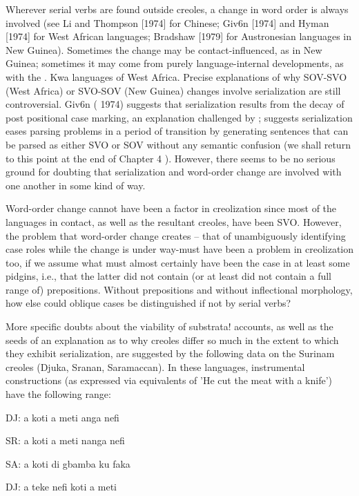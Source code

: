 Wherever serial verbs are found outside creoles, a change in word order is always involved (see Li and Thompson [1974] for Chinese; Giv6n [1974] and Hyman [1974] for West African languages; Brad\-shaw [1979] for Austronesian languages in New Guinea). Sometimes the change may be contact-influenced, as in New Guinea; sometimes it may come from purely language-internal developments, as with the . Kwa languages of West Africa. Precise explanations of why SOV-SVO (West Africa) or SVO-SOV (New Guinea) changes involve serialization are still controversial. Giv6n ( 1974) suggests that serialization results from the decay of post positional case marking, an explanation chal\-lenged by \citet{Hyman1974}; \citet{Bradshaw1979} suggests serialization eases parsing problems in a period of transition by generating sentences that can be parsed as either SVO or SOV without any semantic confu\-sion (we shall return to this point at the end of Chapter 4 ). However, there seems to be no serious ground for doubting that serialization and word-order change are involved with one another in some kind of way.

Word-order change cannot have been a factor in creolization since most of the languages in contact, as well as the resultant creoles, have been SVO. However, the problem that word-order change creates --
that of unambiguously identifying case roles while the change is under way-must have been a problem in creolization too, if we assume what must almost certainly have been the case in at least some pidgins, i.e., that the latter did not contain (or at least did not contain a full range of) prepositions. Without prepositions and without inflectional morphology, how else could oblique cases be distinguished if not by serial verbs?

More specific doubts about the viability of substrata! accounts, as well as the seeds of an explanation as to why creoles differ so much in the extent to which they exhibit serialization, are suggested by the following data on the Surinam creoles (Djuka, Sranan, Saramaccan). In these languages, instrumental constructions (as expressed via equiva\-lents of 'He cut the meat with a knife') have the following range:

\ea\label{ex:228}
 DJ: a koti a meti anga nefi
\z

\ea\label{ex:229}
 SR: a koti a meti nanga nefi
\z

\ea\label{ex:230}
 SA: a koti di gbamba ku faka
\z

\ea\label{ex:231}
 DJ: a teke nefi koti a meti
\z

